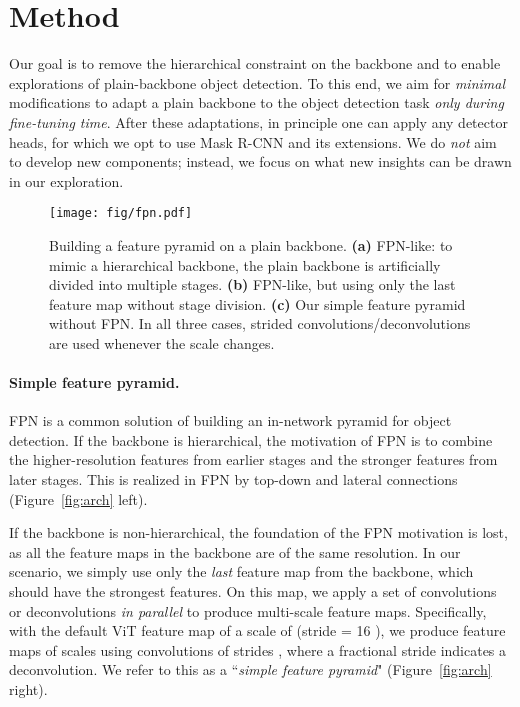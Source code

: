 \documentclass[runningheads]{llncs}
\begin{document}
\section{Method}\label{sec:method}

Our goal is to remove the hierarchical constraint on the backbone and to enable explorations of plain-backbone object detection. To this end, we aim for \textit{minimal} modifications to adapt a plain backbone to the object detection task \textit{only during fine-tuning time}.
After these adaptations, in principle one can apply any detector heads, for which we opt to use Mask R-CNN \cite{He2017} and its extensions. We do \textit{not} aim to develop new components; instead, we focus on what new insights can be drawn in our exploration.


\begin{figure}[t]
    \centering
    \texttt{[image: fig/fpn.pdf]}
    \vspace{-1.5em}
    \caption{Building a feature pyramid on a plain backbone. \textbf{(a)} FPN-like: to mimic a hierarchical backbone, the plain backbone is artificially divided into multiple stages. \textbf{(b)} FPN-like, but using only the last feature map without stage division. \textbf{(c)} Our simple feature pyramid without FPN. In all three cases, strided convolutions/deconvolutions are used whenever the scale changes. 
    }
    \label{fig:fpn}
\end{figure}

\paragraph{Simple feature pyramid.}

FPN \cite{Lin2017} is a common solution of building an \mbox{in-network} pyramid for object detection. If the backbone is hierarchical, the motivation of FPN is to combine the higher-resolution features from earlier stages and the stronger features from later stages. This is realized in FPN by top-down and lateral connections \cite{Lin2017} (Figure~\ref{fig:arch} left).

If the backbone is non-hierarchical, the foundation of the FPN motivation is lost, as all the feature maps in the backbone are of the same resolution. In our scenario, we simply use only the \textit{last} feature map from the backbone, which should have the strongest features. On this map, we apply a set of convolutions or deconvolutions \textit{in parallel} to produce multi-scale feature maps. Specifically, with the default ViT feature map of a scale of  (stride = 16 \cite{Dosovitskiy2021}), we produce feature maps of scales  using convolutions of strides , where a fractional stride indicates a deconvolution. We refer to this as a ``\textit{simple feature pyramid}" (Figure~\ref{fig:arch} right).
\end{document}
